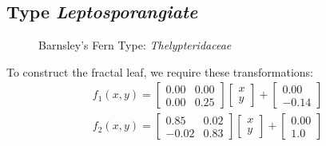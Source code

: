 \documentclass{article}
\begin{document}
\subsection{Type \textit{Leptosporangiate}}

\begin{figure}[H]
\centering 
\noindent{}%
\caption{Barnsley's Fern Type: \textit{Thelypteridaceae}}
\end{figure}
To construct the fractal leaf, we require these transformations:
\begin{gather}
f_1(x, y)=\begin{bmatrix}0.00 & 0.00 \\ 0.00 & 0.25 \end{bmatrix}\begin{bmatrix}x\\y\end{bmatrix} + \begin{bmatrix}0.00\\-0.14\end{bmatrix}
\end{gather}
\begin{gather}
f_2(x, y)=\begin{bmatrix}0.85 & 0.02 \\ -0.02 & 0.83 \end{bmatrix}\begin{bmatrix}x\\y\end{bmatrix} + \begin{bmatrix}0.00\\1.0\end{bmatrix}
\end{gather}
\end{document}
